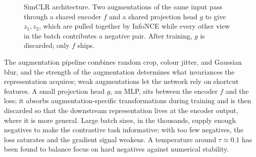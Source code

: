\begin{figure}
\centering
{}
\caption{SimCLR architecture. Two augmentations of the same input pass through a shared encoder $f$ and a shared projection head $g$ to give $z_1, z_2$, which are pulled together by InfoNCE while every other view in the batch contributes a negative pair. After training, $g$ is discarded; only $f$ ships.}
\label{fig:simclr_arch}
\end{figure}

The augmentation pipeline combines random crop, colour jitter, and Gaussian blur, and the strength of the augmentation determines what invariances the representation acquires; weak augmentations let the network rely on shortcut features.
A small projection head $g$, an MLP, sits between the encoder $f$ and the loss; it absorbs augmentation-specific transformations during training and is then discarded so that the downstream representation lives at the encoder output, where it is more general.
Large batch sizes, in the thousands, supply enough negatives to make the contrastive task informative; with too few negatives, the loss saturates and the gradient signal weakens.
A temperature around $\tau \approx 0.1$ has been found to balance focus on hard negatives against numerical stability.

